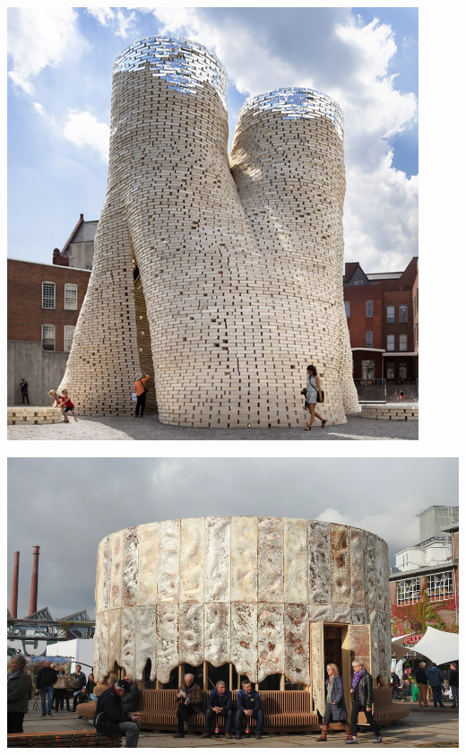 \begin{marginfigure}
    \centering
    \includegraphics{images/ThelivingNewYork_Hy-Fi.png}    
    \caption{}
    \label{fig:NY}
\end{marginfigure}

\begin{marginfigure}
    \centering
    \includegraphics{images/TGP.png}    
    \caption{}
    \label{fig:the living}
\end{marginfigure}

